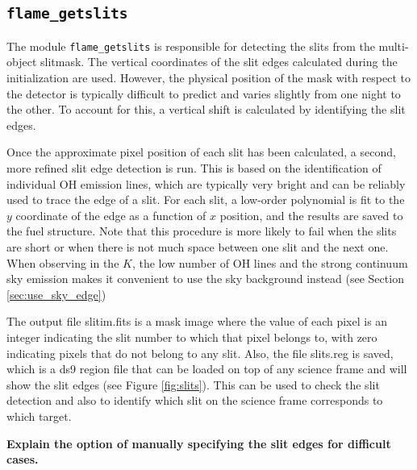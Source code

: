 \documentclass[a4paper, notitlepage]{article}
\begin{document}
\subsection{\texttt{flame\_getslits}}
\label{sec:getslits}

The module \texttt{flame\_getslits} is responsible for detecting the slits from the multi-object slitmask. The vertical coordinates of the slit edges calculated during the initialization are used. However, the physical position of the mask with respect to the detector is typically difficult to predict and varies slightly from one night to the other. To account for this, a vertical shift is calculated by identifying the slit edges.

Once the approximate pixel position of each slit has been calculated, a second, more refined slit edge detection is run. This is based on the identification of individual OH emission lines, which are typically very bright and can be reliably used to trace the edge of a slit. For each slit, a low-order polynomial is fit to the $y$ coordinate of the edge as a function of $x$ position, and the results are saved to the fuel structure. Note that this procedure is more likely to fail when the slits are short or when there is not much space between one slit and the next one. When observing in the $K$, the low number of OH lines and the strong continuum sky emission makes it convenient to use the sky background instead (see Section \ref{sec:use_sky_edge})

The output file slitim.fits is a mask image where the value of each pixel is an integer indicating the slit number to which that pixel belongs to, with zero indicating pixels that do not belong to any slit. Also, the file slits.reg is saved, which is a ds9 region file that can be loaded on top of any science frame and will show the slit edges (see Figure \ref{fig:slits}). This can be used to check the slit detection and also to identify which slit on the science frame corresponds to which target.

\textbf{Explain the option of manually specifying the slit edges for difficult cases.}
\end{document}
